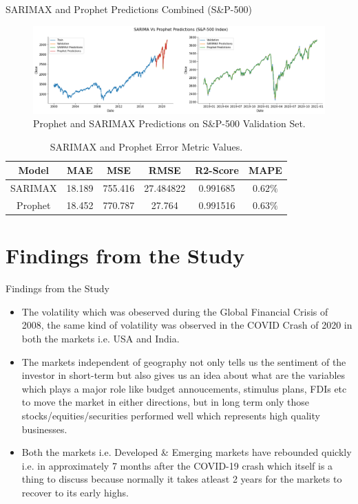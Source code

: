 \documentclass{beamer}
\begin{document}
\begin{frame}{SARIMAX and Prophet Predictions Combined (S\&P-500)}
	\begin{figure}
		\centering
		\includegraphics[width = \textwidth]{images/SARIMAX-Prophet-S&P-500-Predictions.png}
		\caption{Prophet and SARIMAX Predictions on S\&P-500 Validation Set.}
		\label{fig:my_label}
		\pause
	\end{figure}
	\begin{table}[htbp]
		\centering
		\begin{tabular}{c c c c c c}
			\textbf{Model} & \textbf{MAE} & \textbf{MSE} & \textbf{RMSE} & \textbf{R2-Score} & \textbf{MAPE} \\
			\toprule
			SARIMAX        & 18.189       & 755.416      & 27.484822     & 0.991685          & $0.62 \%$     \\
			Prophet        & 18.452       & 770.787      & 27.764        & 0.991516          & $0.63\%$      
			\bottomrule
		\end{tabular}
		\caption{SARIMAX and Prophet Error Metric Values.}
		\label{tab:my_label}
	\end{table}
\end{frame}

\section{Findings from the Study}
\begin{frame}{Findings from the Study}
	\begin{itemize}
		\item The volatility which was obeserved during the Global Financial Crisis of 2008, the same kind of volatility was observed in the COVID Crash of 2020 in both the markets i.e. USA and India.
		      \pause
		\item The markets independent of geography not only tells us the sentiment of the investor in short-term but also gives us an idea about what are the variables which plays a major role like budget annoucements, stimulus plans, FDIs etc to move the market in either directions, but in long term only those stocks/equities/securities performed well which represents high quality businesses.
		      \pause
		\item Both the markets i.e. Developed \& Emerging markets have rebounded quickly i.e. in approximately 7 months after the COVID-19 crash which itself is a thing to discuss because normally it takes atleast 2 years for the markets to recover to its early highs.
	\end{itemize}
\end{frame}
\end{document}
